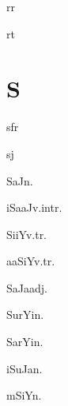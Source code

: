 \begin{multicols*}{2}
\begin{dictroot}{r}{r}
\end{dictroot}

\begin{dictroot}{r}{t}
\end{dictroot}

\section*{S}

\begin{dictroot}{s}{fr}
\end{dictroot}

\begin{dictroot}{s}{j}
    \begin{dictentry}{SaJ}{n.}
    \end{dictentry}
    \begin{dictentry}{iSaaJ}{v.intr.}
    \end{dictentry}
    \begin{dictentry}{SiiY}{v.tr.}
    \end{dictentry}
    \begin{dictentry}{aaSiY}{v.tr.}
    \end{dictentry}
    \begin{dictentry}{SaJa}{adj.}
    \end{dictentry}
    \begin{dictentry}{SurYi}{n.}
    \end{dictentry}
    \begin{dictentry}{SarYi}{n.}
    \end{dictentry}
    \begin{dictentry}{iSuJa}{n.}
    \end{dictentry}
    \begin{dictentry}{mSiY}{n.}

\end{dictentry}
\end{dictroot}
\end{multicols*}

